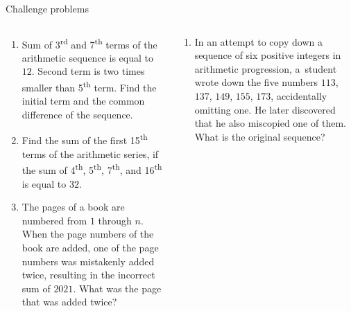 \documentclass[9pt,aspectratio=169]{beamer}
\begin{document}
\begin{frame}{Challenge problems}
  \begin{columns}[T]
    \begin{column}{0.5\textwidth}
      \begin{enumerate}
        \item Sum of 3\textsuperscript{rd} and 7\textsuperscript{th} terms of the arithmetic sequence is equal to $12$. Second term is two times smaller than 5\textsuperscript{th} term. Find the initial term and the common difference of the sequence.
        \item Find the sum of the first 15\textsuperscript{th} terms of the arithmetic series, if the sum of 4\textsuperscript{th}, 5\textsuperscript{th}, 7\textsuperscript{th}, and 16\textsuperscript{th} is equal to $32$.
        \item The pages of a book are numbered from $1$ through $n$. When the page numbers of the book are added, one of the page numbers was mistakenly added twice, resulting in the incorrect sum of $2021$. What was the page that was added twice?
        \seti
      \end{enumerate}
    \end{column}
    \begin{column}{0.5\textwidth}
      \begin{enumerate}
        \conti
        \item In an attempt to copy down a sequence of six positive integers in arithmetic progression, a~student wrote down the five numbers $113$, $137$, $149$, $155$, $173$, accidentally omitting one. He later discovered that he also miscopied one of them. What is the original sequence? 
      \end{enumerate}
    \end{column}
  \end{columns}
\end{frame}

\end{document}
